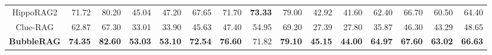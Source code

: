 \begin{table}[!htbp]
\begin{adjustbox}{max width=\textwidth}
\begin{tabular}{c|rr|rr|rr|rr|rr|rr|rr}
HippoRAG2        & 71.72 & 80.20 & 45.04 & 47.20 & 67.65 & 71.70 & \textbf{73.33} & 79.00 & 42.92 & 41.60 & 62.40 & 66.70 & 60.50 & 64.40 \\
Clue-RAG         & 62.87 & 67.30 & 33.01 & 33.90 & 45.63 & 47.40 & 54.95 & 69.20 & 27.39 & 27.80 & 35.87 & 46.30 & 43.29 & 48.65 \\
\midrule
\rowcolor{bubbleblue}
\textbf{BubbleRAG} & \textbf{74.35} & \textbf{82.60} & \textbf{53.03} & \textbf{53.10} & \textbf{72.54} & \textbf{76.60} 
& 71.82 & \textbf{79.10} & \textbf{45.15} & \textbf{44.00} & \textbf{64.97} & \textbf{67.60} & \textbf{63.02} & \textbf{66.63} \\ 
\bottomrule
\end{tabular}
\end{adjustbox}
\end{table}
